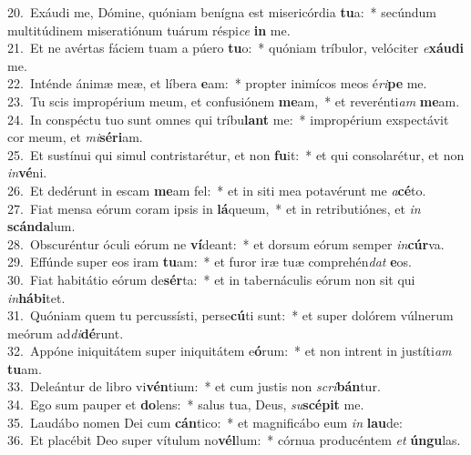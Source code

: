 {20.~}Exáudi me, Dómine, quóniam benígna est misericórdia \textbf{tu}a:~* secúndum multitúdinem miseratiónum tuárum réspi\textit{ce} \textbf{in} me.\\
{21.~}Et ne avértas fáciem tuam a púero \textbf{tu}o:~* quóniam tríbulor, velóciter \textit{e}\textbf{xáu}\textbf{di} me.\\
{22.~}Inténde ánimæ meæ, et líbera \textbf{e}am:~* propter inimícos meos é\textit{ri}\textbf{pe} me.\\
{23.~}Tu scis impropérium meum, et confusiónem \textbf{me}am,~* et reverénti\textit{am} \textbf{me}am.\\
{24.~}In conspéctu tuo sunt omnes qui tríbu\textbf{lant} me:~* impropérium exspectávit cor meum, et \textit{mi}\textbf{sé}\textbf{ri}am.\\
{25.~}Et sustínui qui simul contristarétur, et non \textbf{fu}it:~* et qui consolarétur, et non \textit{in}\textbf{vé}ni.\\
{26.~}Et dedérunt in escam \textbf{me}am fel:~* et in siti mea potavérunt me \textit{a}\textbf{cé}to.\\
{27.~}Fiat mensa eórum coram ipsis in \textbf{lá}queum,~* et in retributiónes, et \textit{in} \textbf{scán}\textbf{da}lum.\\
{28.~}Obscuréntur óculi eórum ne \textbf{ví}deant:~* et dorsum eórum semper \textit{in}\textbf{cúr}va.\\
{29.~}Effúnde super eos iram \textbf{tu}am:~* et furor iræ tuæ comprehén\textit{dat} \textbf{e}os.\\
{30.~}Fiat habitátio eórum de\textbf{sér}ta:~* et in tabernáculis eórum non sit qui \textit{in}\textbf{há}\textbf{bi}tet.\\
{31.~}Quóniam quem tu percussísti, perse\textbf{cú}ti sunt:~* et super dolórem vúlnerum meórum ad\textit{di}\textbf{dé}runt.\\
{32.~}Appóne iniquitátem super iniquitátem e\textbf{ó}rum:~* et non intrent in justíti\textit{am} \textbf{tu}am.\\
{33.~}Deleántur de libro vi\textbf{vén}tium:~* et cum justis non \textit{scri}\textbf{bán}tur.\\
{34.~}Ego sum pauper et \textbf{do}lens:~* salus tua, Deus, \textit{su}\textbf{scé}\textbf{pit} me.\\
{35.~}Laudábo nomen Dei cum \textbf{cán}tico:~* et magnificábo eum \textit{in} \textbf{lau}de:\\
{36.~}Et placébit Deo super vítulum no\textbf{vél}lum:~* córnua producéntem \textit{et} \textbf{ún}\textbf{gu}las.\\
